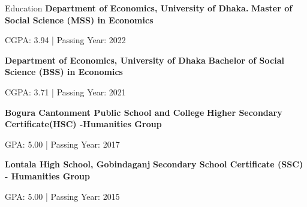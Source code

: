\begin{rubric}{Education}
%
    \textbf{Department of Economics, University of Dhaka.}
    \newline
	\textbf{Master of Social Science (MSS) in Economics}
	\par CGPA: 3.94 \:|\: Passing Year: 2022
 
% 

    \textbf{Department of Economics, University of Dhaka}
    \newline
	\textbf{Bachelor of Social Science (BSS) in Economics}
	\par CGPA: 3.71 \:|\: Passing Year: 2021

    \textbf{Bogura Cantonment Public School and College}
    \newline
	\textbf{Higher Secondary Certificate(HSC) -Humanities Group}
	\par GPA: 5.00 \:|\: Passing Year: 2017


    \textbf{ Lontala High School, Gobindaganj }
    \newline
	\textbf{Secondary School Certificate (SSC) - Humanities Group}
	\par GPA: 5.00 \:|\: Passing Year: 2015
 
\end{rubric}